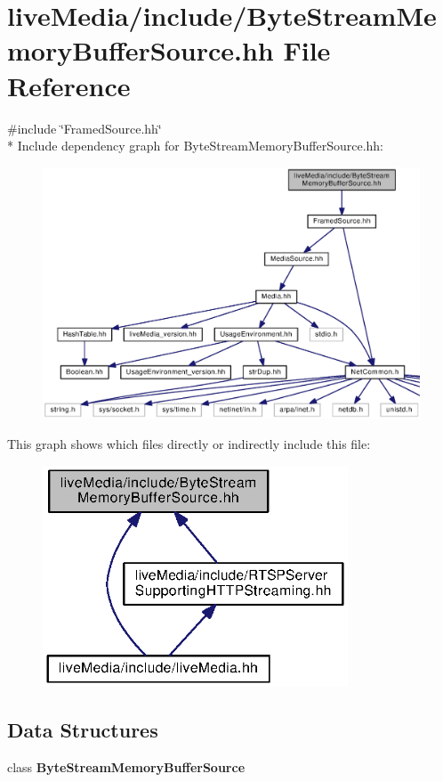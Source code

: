 \section{live\+Media/include/\+Byte\+Stream\+Memory\+Buffer\+Source.hh File Reference}
\label{ByteStreamMemoryBufferSource_8hh}
{\ttfamily \#include \char`\"{}Framed\+Source.\+hh\char`\"{}}\\*
Include dependency graph for Byte\+Stream\+Memory\+Buffer\+Source.\+hh\+:
\nopagebreak
\begin{figure}[H]
\begin{center}
\leavevmode
\includegraphics[width=350pt]{ByteStreamMemoryBufferSource_8hh__incl}
\end{center}
\end{figure}
This graph shows which files directly or indirectly include this file\+:
\nopagebreak
\begin{figure}[H]
\begin{center}
\leavevmode
\includegraphics[width=257pt]{ByteStreamMemoryBufferSource_8hh__dep__incl}
\end{center}
\end{figure}
\subsection*{Data Structures}
\begin{DoxyCompactItemize}
\item 
class {\bf Byte\+Stream\+Memory\+Buffer\+Source}
\end{DoxyCompactItemize}
